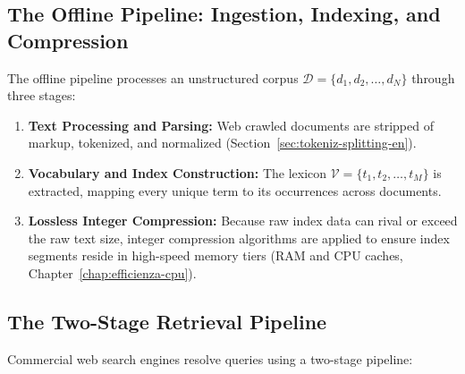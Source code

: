 \subsection{The Offline Pipeline: Ingestion, Indexing, and Compression}
The offline pipeline processes an unstructured corpus $\mathcal{D} = \{d_1, d_2, \dots, d_N\}$ through three stages:
\begin{enumerate}
    \item \textbf{Text Processing and Parsing:} Web crawled documents are stripped of markup, tokenized, and normalized (Section~\ref{sec:tokeniz-splitting-en}).
    \item \textbf{Vocabulary and Index Construction:} The lexicon $\mathcal{V} = \{t_1, t_2, \dots, t_M\}$ is extracted, mapping every unique term to its occurrences across documents.
    \item \textbf{Lossless Integer Compression:} Because raw index data can rival or exceed the raw text size, integer compression algorithms are applied to ensure index segments reside in high-speed memory tiers (RAM and CPU caches, Chapter~\ref{chap:efficienza-cpu}).
\end{enumerate}

\subsection{The Two-Stage Retrieval Pipeline}
Commercial web search engines resolve queries using a two-stage pipeline:

